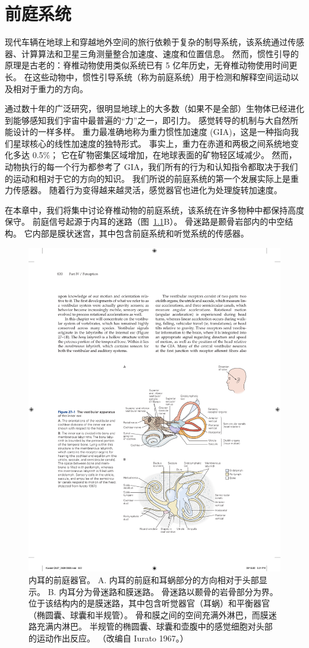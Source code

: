 \chapter{前庭系统} \label{chap:chap27}

现代车辆在地球上和穿越地外空间的旅行依赖于复杂的制导系统，该系统通过传感器、计算算法和卫星三角测量整合加速度、速度和位置信息。
然而，惯性引导的原理是古老的：脊椎动物使用类似系统已有 5 亿年历史，无脊椎动物使用时间更长。
在这些动物中，惯性引导系统（称为前庭系统）用于检测和解释空间运动以及相对于重力的方向。


通过数十年的广泛研究，很明显地球上的大多数（如果不是全部）生物体已经进化到能够感知我们宇宙中最普遍的“力”之一，即引力。
感觉转导的机制与大自然所能设计的一样多样。
重力最准确地称为重力惯性加速度 (GIA)，这是一种指向我们星球核心的线性加速度的独特形式。
事实上，重力在赤道和两极之间系统地变化多达 0.5\%；
它在矿物密集区域增加，在地球表面的矿物轻区域减少。
然而，动物执行的每一个行为都参考了 GIA，我们所有的行为和认知指令都取决于我们的运动和相对于它的方向的知识。
我们所说的前庭系统的第一个发展实际上是重力传感器。
随着行为变得越来越灵活，感觉器官也进化为处理旋转加速度。


在本章中，我们将集中讨论脊椎动物的前庭系统，该系统在许多物种中都保持高度保守。
前庭信号起源于内耳的迷路（图~\ref{fig:27_1}B）。
骨迷路是颞骨岩部内的中空结构。
它内部是膜状迷宫，其中包含前庭系统和听觉系统的传感器。


\begin{figure}[htbp]
	\centering
	\includegraphics[width=0.7\linewidth]{chap27/fig_27_1}
	\caption{内耳的前庭器官。 A. 内耳的前庭和耳蜗部分的方向相对于头部显示。 B. 内耳分为骨迷路和膜迷路。 骨迷路以颞骨的岩骨部分为界。 位于该结构内的是膜迷路，其中包含听觉器官（耳蜗）和平衡器官（椭圆囊、球囊和半规管）。 骨和膜之间的空间充满外淋巴，而膜迷路充满内淋巴。 半规管的椭圆囊、球囊和壶腹中的感觉细胞对头部的运动作出反应。 （改编自 Iurato 1967。）}
	\label{fig:27_1}
\end{figure}


